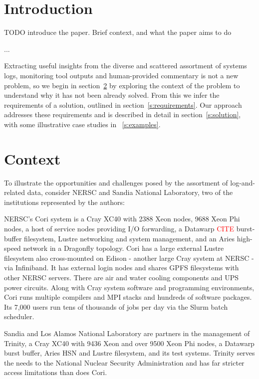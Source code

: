 \section{Introduction}
\label{s:intro}

TODO introduce the paper. Brief context, and what the paper aims to do

...

Extracting useful insights from the diverse and scattered assortment of systems 
logs, monitoring tool outputs and human-provided commentary is not a new 
problem, so we begin in section~\ref{s:context} by exploring the context of the
problem to understand why it has not been already solved. From this we infer 
the requirements of a solution, outlined in section~\ref{s:requirements}. Our 
approach addresses these requirements and is described in detail in 
section~\ref{s:solution}, with some illustrative case studies in 
~\ref{s:examples}.


\section{Context}
\label{s:context}

To illustrate the opportunities and challenges posed by the assortment of 
log-and-related data, consider NERSC and Sandia National Laboratory, two of the 
institutions represented by the authors:

NERSC's Cori system is a Cray XC40 with 2388 Xeon nodes, 9688 Xeon Phi nodes, 
a host of service nodes providing I/O forwarding, a Datawarp \textcolor{red}{CITE}
burst-buffer filesystem, Lustre networking and
system management, and an Aries high-speed network in a Dragonfly topology. Cori
has a large external Lustre filesystem also cross-mounted on Edison - another 
large Cray system at NERSC - via Infiniband. It has external login nodes and 
shares GPFS filesystems with other NERSC servers. There are air and water cooling
components and UPS power circuits. Along with Cray system software and 
programming environments, Cori runs multiple compilers and MPI stacks and
hundreds of software packages. Its 7,000 users run tens of thousands of jobs per 
day via the Slurm batch scheduler.

Sandia and Los Alamos National Laboratory are partners in the management of Trinity, a Cray XC40
with 9436 Xeon and over 9500 Xeon Phi nodes, a Datawarp burst buffer, Aries HSN
and Lustre filesystem, and its test systems. Trinity serves the needs to the National Nuclear 
Security Administration and has far stricter access limitations than does Cori.


